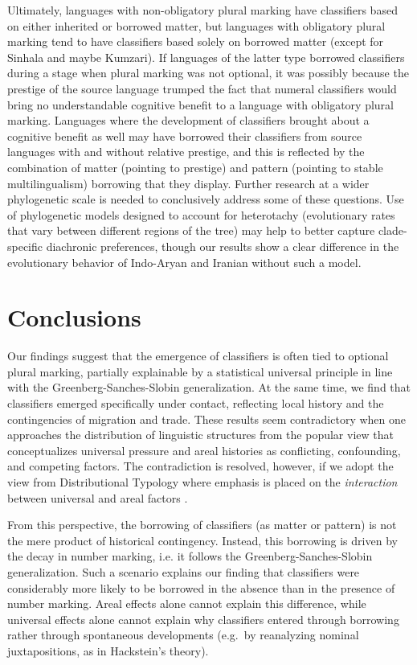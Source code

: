 \documentclass[11pt]{article}
\begin{document}
{\color{green} Ultimately, languages with non-obligatory plural marking have classifiers based on either inherited or borrowed matter, but languages with obligatory plural marking tend to have classifiers based {solely} on borrowed matter (except for Sinhala and maybe Kumzari). If languages of the latter type borrowed classifiers during a stage when plural marking was not optional, it was possibly because the prestige of the source language trumped the fact that numeral classifiers would bring no understandable cognitive benefit to a language with obligatory plural marking. 
Languages where the development of classifiers brought about a cognitive benefit as well may have borrowed their classifiers from source languages with and without relative prestige, and this is reflected by the combination of matter (pointing to prestige) and pattern (pointing to stable multilingualism) borrowing that they display. 
Further research at a wider phylogenetic scale is needed to conclusively address some of these questions.
Use of phylogenetic models designed to account for heterotachy (evolutionary rates that vary between different regions of the tree) may help to better capture clade-specific diachronic preferences, though our results show a clear difference in the evolutionary behavior of Indo-Aryan and Iranian without such a model.}


\section{Conclusions}
\label{conc}
Our findings suggest that the emergence of classifiers is often tied to optional plural marking, partially explainable by a statistical universal principle in line with the Greenberg-Sanches-Slobin generalization. 
At the same time, we find that classifiers emerged specifically under contact, reflecting local history and the contingencies of migration and trade. These results seem contradictory when one approaches the distribution of linguistic structures from the popular view that conceptualizes universal pressure and areal histories as conflicting, confounding, and competing factors. The contradiction is resolved, however, if we adopt the view from Distributional Typology \citep{Bickel2015Distributional} where emphasis is placed on the \emph{interaction} between universal and areal factors \citep{Bickel2014Areas}. 

From this perspective, the borrowing of classifiers (as matter or pattern) is not the mere product of historical contingency. Instead, this borrowing is driven by the decay in number marking, i.e. it follows the Greenberg-Sanches-Slobin generalization. Such a scenario explains our finding that classifiers were considerably more likely to be borrowed in the absence than in the presence of number marking. Areal effects alone cannot explain this difference, while universal effects alone cannot explain why classifiers entered through borrowing rather through spontaneous developments (e.g.\ by reanalyzing nominal juxtapositions, as in Hackstein's \citeyear{Hackstein2010} theory).
\end{document}
